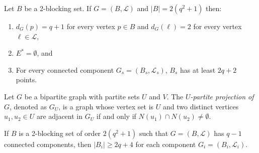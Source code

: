 \documentclass[10pt,a4paper]{amsart}
\begin{document}
\begin{lemma}\label{Lem:CotaB}
    Let $B$ be a 2-blocking set. If $G=(B,\mathcal{L})$ and $|B|=2(q^2+1)$ then:
    \begin{enumerate}
    \item $d_G(p)=q+1$ for every vertex $p\in B$ and $d_G(\ell)=2$ for every vertex $\ell \in \mathcal{L}$,
        \item $E^*=\emptyset$, and 
    \item For every connected component $G_s=(B_s,\mathcal{L}_s)$, $B_s$ has at least $2q+2$ points.
    \end{enumerate}
\end{lemma}   

\begin{defn}\label{def:projection}
Let $G$ be a bipartite graph with partite sets $U$ and $V$. The \emph{$U$-partite projection of $G$}, denoted as $G_U$, is a graph whose vertex set is $U$ and two distinct vertices $u_1, u_2 \in U$ are adjacent in $G_U$ if and only if $N(u_1)\cap N(u_2)\neq\emptyset$.     
\end{defn}

\begin{lemma}\label{Lem:CotaB_q-1}
  If $B$ is a 2-blocking set of order $2(q^2+1)$ such that $G=(B,\mathcal{L})$ has $q-1$ connected components, then $|B_i|\ge2q+4$ for each component $G_i=(B_i,\mathcal{L}_i)$.
\end{lemma}
\end{document}
